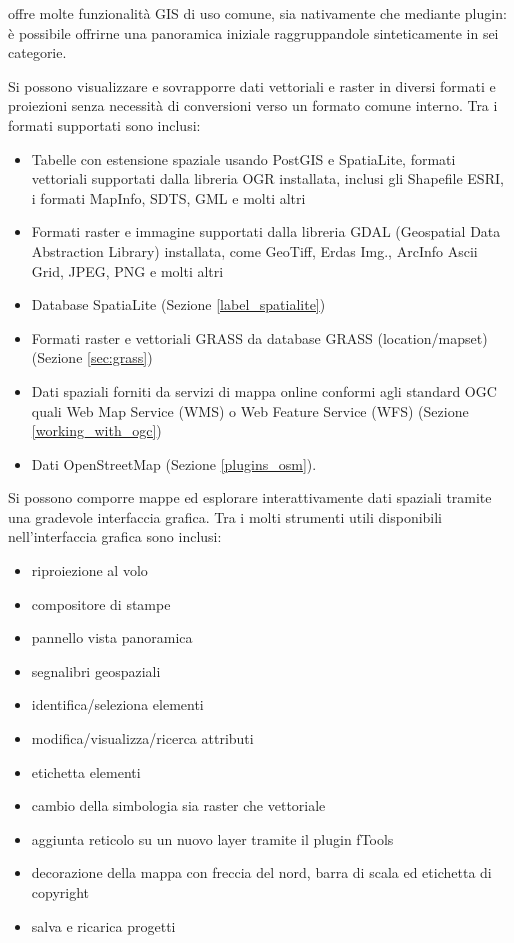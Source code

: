 \label{label_majfeat}

\qg offre molte funzionalità GIS di uso comune, sia nativamente che mediante 
plugin: è possibile offrirne una panoramica iniziale raggruppandole sinteticamente 
in sei categorie.


Si possono visualizzare e sovrapporre dati vettoriali e raster in diversi formati e proiezioni senza
necessità di conversioni verso un formato comune interno. Tra i formati supportati sono inclusi:

\begin{itemize}[label=--]
\item Tabelle con estensione spaziale usando PostGIS e SpatiaLite, formati vettoriali 
supportati dalla libreria OGR installata, inclusi gli Shapefile ESRI, i formati MapInfo, 
SDTS, GML e molti altri
\item Formati raster e immagine supportati dalla libreria GDAL (Geospatial Data 
Abstraction Library) installata, come GeoTiff, Erdas Img., ArcInfo Ascii Grid, 
JPEG, PNG e molti altri
\item Database SpatiaLite (Sezione \ref{label_spatialite}) 
\item Formati raster e vettoriali GRASS da database GRASS (location/mapset) (Sezione \ref{sec:grass})
\item Dati spaziali forniti da servizi di mappa online conformi agli standard OGC quali Web Map
Service (WMS) o Web Feature Service (WFS) (Sezione \ref{working_with_ogc})
\item Dati OpenStreetMap (Sezione \ref{plugins_osm}).
\end{itemize}


Si possono comporre mappe ed esplorare interattivamente dati spaziali tramite una gradevole 
interfaccia grafica. Tra i molti strumenti utili disponibili nell’interfaccia grafica sono inclusi:

\begin{itemize}[label=--]
\item riproiezione al volo
\item compositore di stampe
\item pannello vista panoramica
\item segnalibri geospaziali
\item identifica/seleziona elementi
\item modifica/visualizza/ricerca attributi
\item etichetta elementi
\item cambio della simbologia sia raster che vettoriale
\item aggiunta reticolo su un nuovo layer tramite il plugin fTools
\item decorazione della mappa con freccia del nord, barra di scala ed etichetta di copyright
\item salva e ricarica progetti
\end{itemize}

